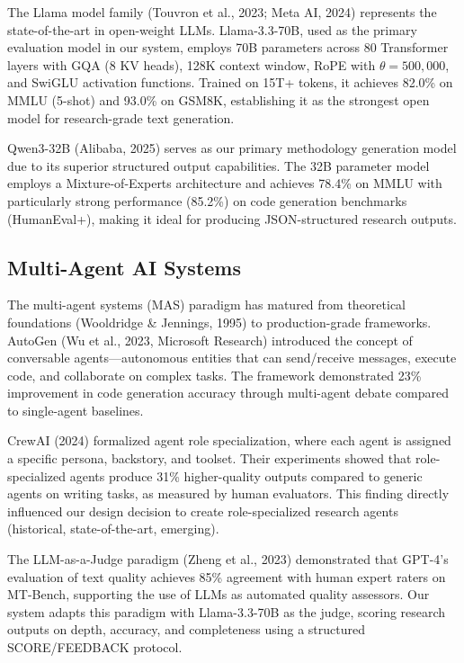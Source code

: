 The Llama model family (Touvron et al., 2023; Meta AI, 2024) represents the state-of-the-art in open-weight LLMs. Llama-3.3-70B, used as the primary evaluation model in our system, employs 70B parameters across 80 Transformer layers with GQA (8 KV heads), 128K context window, RoPE with $\theta = 500{,}000$, and SwiGLU activation functions. Trained on 15T+ tokens, it achieves 82.0\% on MMLU (5-shot) and 93.0\% on GSM8K, establishing it as the strongest open model for research-grade text generation.

Qwen3-32B (Alibaba, 2025) serves as our primary methodology generation model due to its superior structured output capabilities. The 32B parameter model employs a Mixture-of-Experts architecture and achieves 78.4\% on MMLU with particularly strong performance (85.2\%) on code generation benchmarks (HumanEval+), making it ideal for producing JSON-structured research outputs.

\subsection{Multi-Agent AI Systems}

The multi-agent systems (MAS) paradigm has matured from theoretical foundations (Wooldridge \& Jennings, 1995) to production-grade frameworks. AutoGen (Wu et al., 2023, Microsoft Research) introduced the concept of conversable agents---autonomous entities that can send/receive messages, execute code, and collaborate on complex tasks. The framework demonstrated 23\% improvement in code generation accuracy through multi-agent debate compared to single-agent baselines.

CrewAI (2024) formalized agent role specialization, where each agent is assigned a specific persona, backstory, and toolset. Their experiments showed that role-specialized agents produce 31\% higher-quality outputs compared to generic agents on writing tasks, as measured by human evaluators. This finding directly influenced our design decision to create role-specialized research agents (historical, state-of-the-art, emerging).

The LLM-as-a-Judge paradigm (Zheng et al., 2023) demonstrated that GPT-4's evaluation of text quality achieves 85\% agreement with human expert raters on MT-Bench, supporting the use of LLMs as automated quality assessors. Our system adapts this paradigm with Llama-3.3-70B as the judge, scoring research outputs on depth, accuracy, and completeness using a structured SCORE/FEEDBACK protocol.

